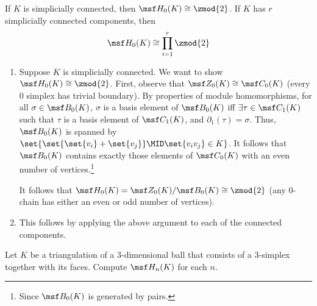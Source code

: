 \begin{problem}[16.8]
  If $K$ is simplicially connected, then $\msf H_0(K) \cong \zmod{2}$. If $K$
  has $r$ simplicially connected components, then
  \[
    \msf H_0(K)\cong \prod_{i=1}^r \zmod{2}
  \]
\end{problem}
\begin{solution}
  \begin{enumerate}
    \item Suppose $K$ is simplicially connected. We want to show $\msf H_0(K)
      \cong \zmod{2}$. First, observe that $\msf Z_0(K) \cong \msf C_0(K)$
      (every 0 simplex has trivial boundary). By properties of module
      homomorphisms, for all $\sigma \in \msf B_0(K)$, $\sigma$ is a basis
      element of $\msf B_0(K)$ iff $\exists \tau \in \msf C_1(K)$ such that
      $\tau$ is a basis element of $\msf C_1(K)$, and $\partial_1(\tau) =
      \sigma$. Thus, $\msf B_0(K)$ is spanned by $\set{\set{\set{v_i} +
          \set{v_j}} \MID \set{v_iv_j} \in K}$. It follows that $\msf B_0(K)$
      contains exactly those elements of $\msf C_0(K)$ with an even number of
      vertices.\footnote{Since $\msf B_0(K)$ is generated by pairs.}

      It follows that $\msf H_0(K) = \msf Z_0(K)/\msf B_0(K) \cong \zmod{2}$
      (any $0$-chain has either an even or odd number of vertices).
    \item This follows by applying the above argument to each of the connected
      components.
  \end{enumerate}
\end{solution}
\begin{problem}[16.9]
  Let $K$ be a triangulation of a $3$-dimensional ball that consists of a
  3-simplex together with its faces. Compute $\msf H_n(K)$ for each $n$.
\end{problem}
